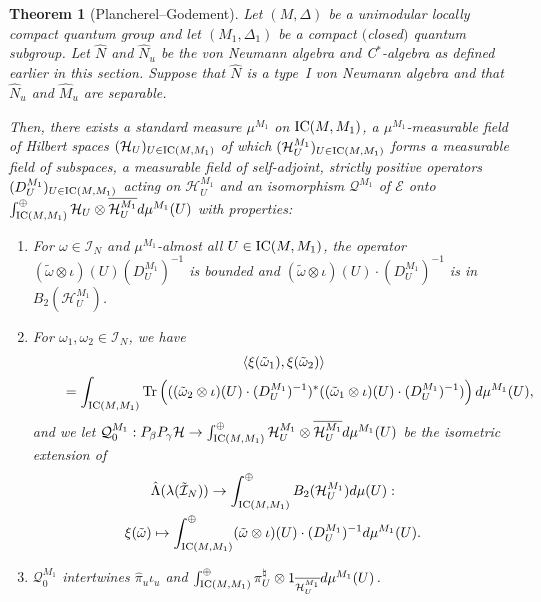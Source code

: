 \documentclass[pdftex]{sigma}
\numberwithin{equation}{section}
\newtheorem{thm}{Theorem}[section]
\theoremstyle{definition}
\newcommand{\cHil}{\mathcal{H}}
\newcommand{\ICMM}{\text{\rm IC}(M, M_1)}
\begin{document}
\begin{thm}[Plancherel--Godement]\label{ThmPG}
Let $(M, \Delta)$ be a unimodular locally compact quantum group and let $(M_1, \Delta_1)$ be a compact $($closed$)$ quantum subgroup. Let $\hat{N}$ and $\hat{N}_u$ be the von Neumann algebra and C$^\ast$-algebra as defined earlier in this section. Suppose that $\hat{N}$ is a type~I von Neumann algebra and that $\hat{N}_u$ and $\hat{M}_u$ are separable.

Then, there exists a standard measure $\mu^{M_1}$ on $\ICMM$, a $\mu^{M_1}$-measurable field of Hilbert spaces $(\cHil_U)_{U \in \ICMM}$ of which $(\cHil_U^{M_1})_{U \in \ICMM}$ forms a measurable field of subspaces, a measurable field  of self-adjoint, strictly positive operators $(D_U^{M_1})_{U \in \ICMM}$ acting on $\cHil_U^{M_1}$ and an isomorphism $\mathcal{Q}^{M_1}$ of $\mathcal{E}$ onto $\int^\oplus_{\ICMM} \cHil_U \otimes \overline{ \cHil_U^{M_1}} d\mu^{M_1}(U)$ with properties:
\begin{enumerate}\itemsep=0pt

\item\label{ItemPGOne} For $\omega \in \mathcal{I}_N$ and $\mu^{M_1}$-almost all $U \in \ICMM$, the operator $(\tilde{\omega} \otimes \iota)(U)  (D_U^{M_1})^{-1}$ is bounded and $(\tilde{\omega} \otimes \iota )(U) \cdot (D_U^{M_1})^{-1}$ is in $B_2( \cHil_U^{M_1})$.
\item\label{ItemPGTwoA} For $\omega_1, \omega_2 \in \mathcal{I}_N$, we have
\begin{gather*}
\langle \xi(\tilde{\omega}_1),  \xi(\tilde{\omega}_2) \rangle\\
\qquad{} =
\int_{\ICMM} {\rm Tr} \left( ( ( \tilde{\omega}_2 \otimes \iota)(U) \cdot (D_U^{M_1})^{-1} )^{\ast}( ( \tilde{\omega}_1 \otimes \iota)(U) \cdot (D_U^{M_1})^{-1}) \right) d\mu^{M_1}(U),
\end{gather*}
and we let $\mathcal{Q}_0^{M_1}: P_\beta P_\gamma \cHil \rightarrow \int^\oplus_{\ICMM} \cHil_U^{M_1} \otimes \overline{\cHil_U^{M_1}} d\mu^{M_1}(U)$ be the isometric extension of
\begin{gather*}
\hat{\Lambda}(\lambda(\tilde{\mathcal{I}}_N)) \rightarrow \int_{\ICMM}^\oplus B_2 (\cHil_U^{M_1})d\mu(U): \\ \xi(\tilde{\omega}) \mapsto \int^\oplus_{\ICMM} (\tilde{\omega} \otimes \iota)(U) \cdot (D_U^{M_1})^{-1} d\mu^{M_1}(U).
\end{gather*}
\item\label{ItemPGTwoB}
 $\mathcal{Q}_0^{M_1}$ intertwines $\hat{\pi}_{u} \iota_u$ and $\int_{\ICMM}^\oplus  \pi_U^\natural \otimes 1_{ \overline{ \cHil_U^{M_1}}} d\mu^{M_1}(U)$.


\end{enumerate}
\end{thm}
\end{document}
